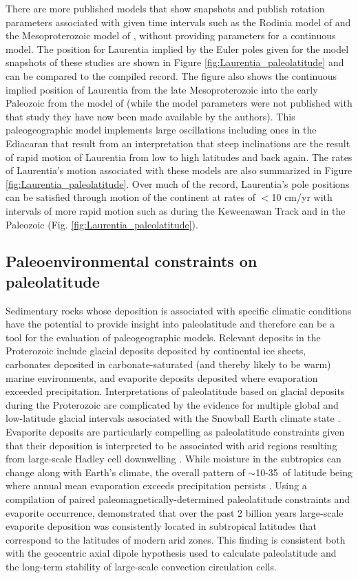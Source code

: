 \documentclass[twocolumn, switch]{article} %
\begin{document}
There are more published models that show snapshots and publish rotation parameters associated with given time intervals such as the Rodinia model of \cite{Li2008a} and the Mesoproterozoic model of \cite{Pisarevsky2014b}, without providing parameters for a continuous model. The position for Laurentia implied by the Euler poles given for the model snapshots of these studies are shown in Figure \ref{fig:Laurentia_paleolatitude} and can be compared to the compiled record. The figure also shows the continuous implied position of Laurentia from the late Mesoproterozoic into the early Paleozoic from the model of \citet{Li2013a} (while the model parameters were not published with that study they have now been made available by the authors). This paleogeographic model implements large oscillations including ones in the Ediacaran that result from an interpretation that steep inclinations are the result of rapid motion of Laurentia from low to high latitudes and back again. The rates of Laurentia's motion associated with these models are also summarized in Figure \ref{fig:Laurentia_paleolatitude}. Over much of the record, Laurentia's pole positions can be satisfied through motion of the continent at rates of $<$10 cm/yr with intervals of more rapid motion such as during the Keweenawan Track and in the Paleozoic (Fig. \ref{fig:Laurentia_paleolatitude}).

\subsection{Paleoenvironmental constraints on paleolatitude}

Sedimentary rocks whose deposition is associated with specific climatic conditions have the potential to provide insight into paleolatitude and therefore can be a tool for the evaluation of paleogeographic models. Relevant deposits in the Proterozoic include glacial deposits deposited by continental ice sheets, carbonates deposited in carbonate-saturated (and thereby likely to be warm) marine environments, and evaporite deposits deposited where evaporation exceeded precipitation. Interpretations of paleolatitude based on glacial deposits during the Proterozoic are complicated by the evidence for multiple global and low-latitude glacial intervals associated with the Snowball Earth climate state \citep{Evans2003b}. Evaporite deposits are particularly compelling as paleolatitude constraints given that their deposition is interpreted to be associated with arid regions resulting from large-scale Hadley cell downwelling \citep{Evans2006a}. While moisture in the subtropics can change along with Earth's climate, the overall pattern of $\sim$10-35\textdegree\ of latitude being where annual mean evaporation exceeds precipitation persists \citep{Burls2017a}. Using a compilation of paired paleomagnetically-determined paleolatitude constraints and evaporite occurrence, \cite{Evans2006a} demonstrated that over the past 2 billion years large-scale evaporite deposition was consistently located in subtropical latitudes that correspond to the latitudes of modern arid zones. This finding is consistent both with the geocentric axial dipole hypothesis used to calculate paleolatitude and the long-term stability of large-scale convection circulation cells. 
\end{document}
